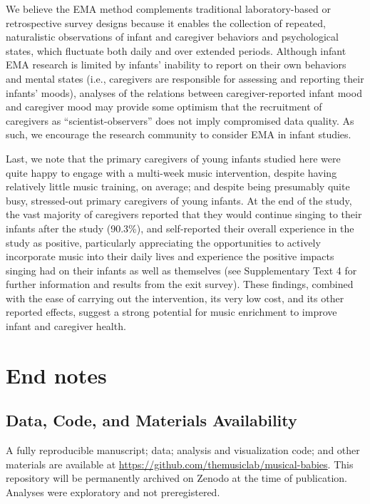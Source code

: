 \documentclass[
]{article}
\begin{document}
We believe the EMA method complements traditional laboratory-based or
retrospective survey designs because it enables the collection of
repeated, naturalistic observations of infant and caregiver behaviors
and psychological states, which fluctuate both daily and over extended
periods. Although infant EMA research is limited by infants' inability
to report on their own behaviors and mental states (i.e., caregivers are
responsible for assessing and reporting their infants' moods), analyses
of the relations between caregiver-reported infant mood and caregiver
mood may provide some optimism that the recruitment of caregivers as
``scientist-observers'' does not imply compromised data quality. As
such, we encourage the research community to consider EMA in infant
studies.

Last, we note that the primary caregivers of young infants studied here
were quite happy to engage with a multi-week music intervention, despite
having relatively little music training, on average; and despite being
presumably quite busy, stressed-out primary caregivers of young infants.
At the end of the study, the vast majority of caregivers reported that
they would continue singing to their infants after the study (90.3\%),
and self-reported their overall experience in the study as positive,
particularly appreciating the opportunities to actively incorporate
music into their daily lives and experience the positive impacts singing
had on their infants as well as themselves (see Supplementary Text 4 for
further information and results from the exit survey). These findings,
combined with the ease of carrying out the intervention, its very low
cost, and its other reported effects, suggest a strong potential for
music enrichment to improve infant and caregiver health.

\clearpage

\section*{End notes}\label{end-notes}

\subsection*{Data, Code, and Materials
Availability}\label{data-code-and-materials-availability}

A fully reproducible manuscript; data; analysis and visualization code;
and other materials are available at
\url{https://github.com/themusiclab/musical-babies}. This repository
will be permanently archived on Zenodo at the time of publication.
Analyses were exploratory and not preregistered.
\end{document}
